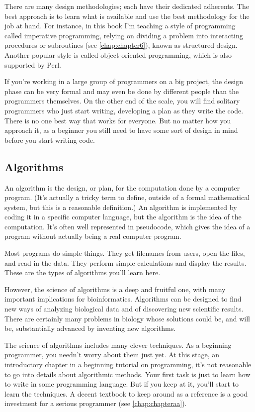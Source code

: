 There are many design methodologies; each have their dedicated adherents. The best approach is to learn what is available and use the best methodology for the job at hand. For instance, in this book I'm teaching a style of programming called imperative programming, relying on dividing a problem into interacting procedures or subroutines (see \ref{chap:chapter6}), known as structured design. Another popular style is called object-oriented programming, which is also supported by Perl.

If you're working in a large group of programmers on a big project, the design phase can be very formal and may even be done by different people than the programmers themselves. On the other end of the scale, you will find solitary programmers who just start writing, developing a plan as they write the code. There is no one best way that works for everyone. But no matter how you approach it, as a beginner you still need to have some sort of design in mind before you start writing code. 

\subsection{Algorithms}
An algorithm is the design, or plan, for the computation done by a computer program. (It's actually a tricky term to define, outside of a formal mathematical system, but this is a reasonable definition.) An algorithm is implemented by coding it in a specific computer language, but the algorithm is the idea of the computation. It's often well represented in pseudocode, which gives the idea of a program without actually being a real computer program.

Most programs do simple things. They get filenames from users, open the files, and read in the data. They perform simple calculations and display the results. These are the types of algorithms you'll learn here.

However, the science of algorithms is a deep and fruitful one, with many important implications for bioinformatics. Algorithms can be designed to find new ways of analyzing biological data and of discovering new scientific results. There are certainly many problems in biology whose solutions could be, and will be, substantially advanced by inventing new algorithms.

The science of algorithms includes many clever techniques. As a beginning programmer, you needn't worry about them just yet. At this stage, an introductory chapter in a beginning tutorial on programming, it's not reasonable to go into details about algorithmic methods. Your first task is just to learn how to write in some programming language. But if you keep at it, you'll start to learn the techniques. A decent textbook to keep around as a reference is a good investment for a serious programmer (see \ref{chap:chapteraa}).

